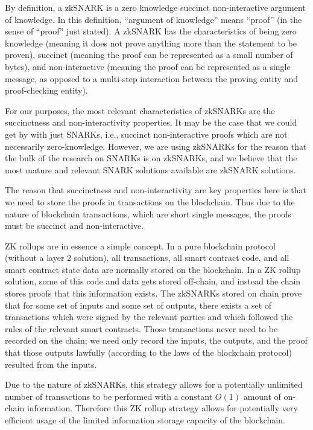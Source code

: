 \documentclass[12pt]{article}
\begin{document}
By definition, a zkSNARK is a zero knowledge succinct non-interactive argument of knowledge. In this definition, ``argument of knowledge'' means ``proof'' (in the sense of ``proof'' just stated). A zkSNARK has the characteristics of being zero knowledge (meaning it does not prove anything more than the statement to be proven), succinct (meaning the proof can be represented as a small number of bytes), and non-interactive (meaning the proof can be represented as a single message, as opposed to a multi-step interaction between the proving entity and proof-checking entity).

For our purposes, the most relevant characteristics of zkSNARKs are the succinctness and non-interactivity properties. It may be the case that we could get by with just SNARKs, i.e., succinct non-interactive proofs which are not necessarily zero-knowledge. However, we are using zkSNARKs for the reason that the bulk of the research on SNARKs is on zkSNARKs, and we believe that the most mature and relevant SNARK solutions available are zkSNARK solutions.

The reason that succinctness and non-interactivity are key properties here is that we need to store the proofs in transactions on the blockchain. Thus due to the nature of blockchain transactions, which are short single messages, the proofs must be succinct and non-interactive.

ZK rollups are in essence a simple concept. In a pure blockchain protocol (without a layer 2 solution), all transactions, all smart contract code, and all smart contract state data are normally stored on the blockchain. In a ZK rollup solution, some of this code and data gets stored off-chain, and instead the chain stores proofs that this information exists. The zkSNARKs stored on chain prove that for some set of inputs and some set of outputs, there exists a set of transactions which were signed by the relevant parties and which followed the rules of the relevant smart contracts. Those transactions never need to be recorded on the chain; we need only record the inputs, the outputs, and the proof that those outputs lawfully (according to the laws of the blockchain protocol) resulted from the inputs.

Due to the nature of zkSNARKs, this strategy allows for a potentially unlimited number of transactions to be performed with a constant $O(1)$ amount of on-chain information. Therefore this ZK rollup strategy allows for potentially very efficient usage of the limited information storage capacity of the blockchain. 
\end{document}
